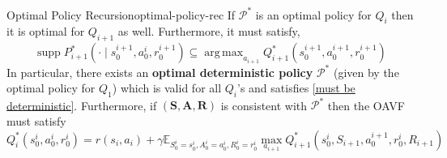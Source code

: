 \documentclass[a4paper, 11pt]{article}
\numberwithin{equation}{section}
\theoremstyle{plain}
\theoremstyle{definition}
\newcommand{\E}{{\mathbb E}}
\newcommand{\1}{{\mathbbm 1}}
\newcommand{\mb}[1]{\mathbf{#1}}
\newcommand{\mc}[1]{\mathcal{#1}}
\DeclareMathOperator*{\argmax}{arg\,max}
\DeclareMathOperator*{\supp}{supp}
\begin{document}
	\begin{ftheo}{Optimal Policy Recursion}{optimal-policy-rec}
		If $\mc{P}^{*}$ is an optimal policy for $Q_i$ then it is optimal for $Q_{i + 1}$ as well. Furthermore, it must satisfy,
		\begin{equation}\label{must be deterministic}
			\supp P^*_{i + 1}(\cdot\;|\; s_0^{i + 1}, a_0^i, r_0^{i + 1}) \subseteq   \argmax_{a_{i + 1}} Q_{i + 1}^{*}(s_0^{i + 1}, a_0^{i + 1}, r_0^{i + 1})
		\end{equation} 
		In particular, there exists an \textbf{optimal deterministic policy} $\mc{P}^*$ (given by the optimal policy for $Q_1$) which is valid for all $Q_i$'s and satisfies \eqref{must be deterministic}. Furthermore, if $(\mb{S}, \mb{A}, \mb{R})$ is consistent with $\mc{P}^*$ then the OAVF must satisfy
		\begin{equation}\label{recurrence optimal qi}
			Q_i^{*}(s_0^i, a_0^{i }, r_0^i) = r(s_i, a_i) + \gamma\E_{S_0^i = s_0^i, A_0^{i} = a_0^{i}, R_0^i = r_0^i} \max_{a_{i + 1}} Q_{i + 1}^{*}(s_0^{i}, S_{i + 1}, a_0^{i + 1}, r_0^{i}, R_{i + 1})
		\end{equation}
	\end{ftheo}
	
\end{document}
